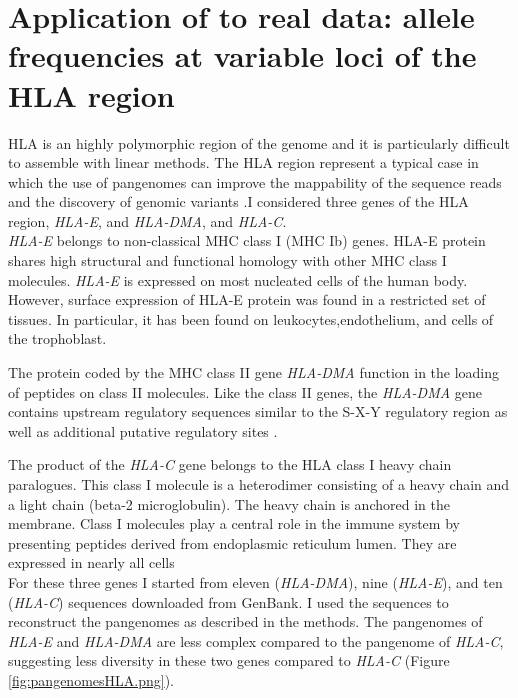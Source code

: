 \newpage
\section{Application of \vgp to real data: allele frequencies at variable loci of the HLA region}

HLA is an highly polymorphic region of the genome and it is particularly difficult to assemble with linear methods. The HLA region represent a typical case in which the use of pangenomes can improve the mappability of the sequence reads and the discovery of genomic variants \cite{chin2019diploid}.I considered three genes of the HLA region, \textit{HLA-E}, and \textit{HLA-DMA}, and \textit{HLA-C}.\\

\textit{HLA-E} belongs to non-classical MHC class I (MHC Ib) genes. HLA-E protein shares high structural and functional homology with other MHC class I molecules. \textit{HLA-E} is expressed on most nucleated cells of the human body. However, surface expression of HLA-E protein was found in a restricted set of tissues. In particular, it has been found on leukocytes,endothelium, and cells of the trophoblast\cite{kanevskiy2019dimorphism}.

The protein coded by the MHC class II gene \textit{HLA-DMA} function in the loading of peptides on class II molecules. Like the class II genes, the \textit{HLA-DMA} gene contains upstream regulatory sequences similar to the S-X-Y regulatory region as well as additional putative regulatory sites \cite{westerheide1997hla}.

The product of the \textit{HLA-C} gene belongs to the HLA class I heavy chain paralogues. This class I molecule is a heterodimer consisting of a heavy chain and a light chain (beta-2 microglobulin). The heavy chain is anchored in the membrane. Class I molecules play a central role in the immune system by presenting peptides derived from endoplasmic reticulum lumen. They are expressed in nearly all cells\cite{HLA-C}\\

For these three genes I started from eleven (\textit{HLA-DMA}), nine (\textit{HLA-E}), and ten (\textit{HLA-C}) sequences downloaded from GenBank. I used the sequences to reconstruct the pangenomes as described in the methods. The pangenomes of \textit{HLA-E} and \textit{HLA-DMA} are less complex compared to the pangenome of \textit{HLA-C}, suggesting less diversity in these two genes compared to \textit{HLA-C} (Figure \ref{fig:pangenomesHLA.png}).\\ 

